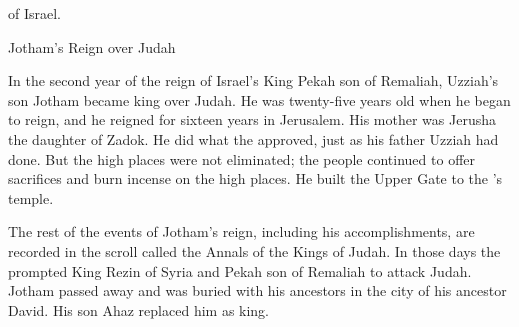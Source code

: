 {of Israel.
\par }{\SH Jotham’s Reign over Judah
\par }{\PP {}In the second
year
of the reign
of Israel’s
King
Pekah
son
of Remaliah,
Uzziah’s
son
Jotham
became king
over Judah.
He was twenty-five
years
old
when he began
to reign,
and he reigned
for sixteen
years
in Jerusalem.
His mother
was Jerusha
the daughter
of Zadok.
He did
what the
{}
approved,
just as
his father
Uzziah
had done.
But
the high places
were not
eliminated;
the people
continued
to offer sacrifices and burn incense
on the high places.
He built
the Upper
Gate
to the
{}’s
temple.
\par }{\PP {}The rest
of the events
of Jotham’s
reign, including
his accomplishments,
are recorded
in the scroll
called the Annals
of the Kings
of Judah.
In those
days
the {}
prompted
King
Rezin
of Syria
and Pekah
son
of Remaliah
to attack Judah.
Jotham
passed away
and was buried
with
his ancestors
in the city
of his ancestor
David.
His son
Ahaz
replaced
him as king.

}

